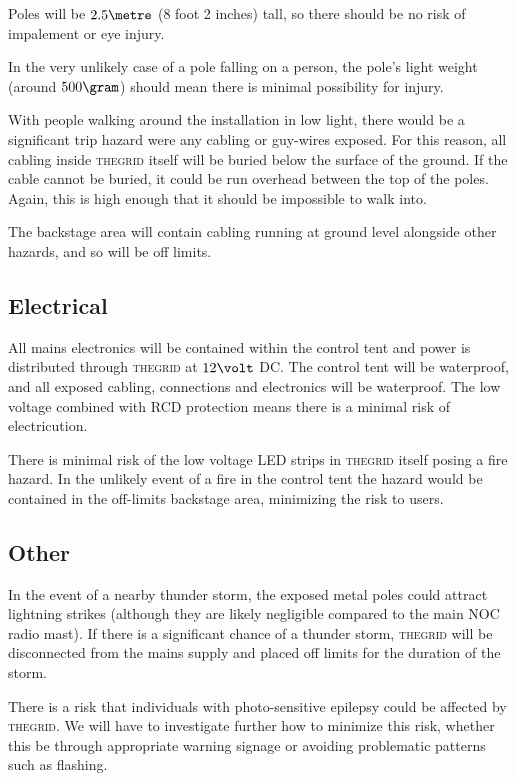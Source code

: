 \documentclass[12pt]{article} %
\newcommand{\thegrid}{\textsc{the\textperiodcentered grid}\xspace}
\begin{document}
Poles will be $2.5\metre$ (8 foot 2 inches) tall, so there should be no risk of impalement or eye injury.

In the very unlikely case of a pole falling on a person, the pole's light weight (around $500\gram$) should mean there is minimal possibility for injury.

With people walking around the installation in low light, there would be a significant trip hazard were any cabling or guy-wires exposed.  For this reason, all cabling inside \thegrid itself will be buried below the surface of the ground.  If the cable cannot be buried, it could be run overhead between the top of the poles.  Again, this is high enough that it should be impossible to walk into.

The backstage area will contain cabling running at ground level alongside other hazards, and so will be off limits.

\subsection{Electrical}
All mains electronics will be contained within the control tent and power is distributed through \thegrid at $12\volt$ DC.  The control tent will be waterproof, and all exposed cabling, connections and electronics will be waterproof.  The low voltage combined with RCD protection means there is a minimal risk of electricution.

There is minimal risk of the low voltage LED strips in \thegrid itself posing a fire hazard.  In the unlikely event of a fire in the control tent the hazard would be contained in the off-limits backstage area, minimizing the risk to users.

\subsection{Other}
In the event of a nearby thunder storm, the exposed metal poles could attract lightning strikes (although they are likely negligible compared to the main NOC radio mast).  If there is a significant chance of a thunder storm, \thegrid will be disconnected from the mains supply and placed off limits for the duration of the storm.

There is a risk that individuals with photo-sensitive epilepsy could be affected by \thegrid.  We will have to investigate further how to minimize this risk, whether this be through appropriate warning signage or avoiding problematic patterns such as flashing.
\end{document}
